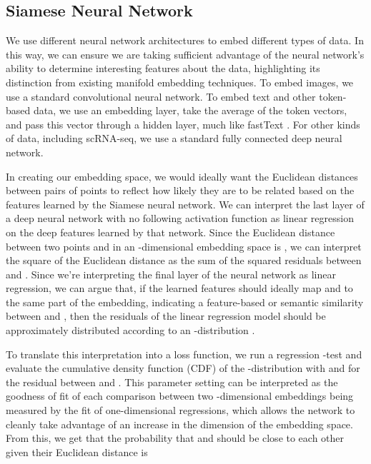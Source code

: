 \documentclass{article}
\begin{document}
\subsection{Siamese Neural Network}



We use different neural network architectures to embed different types of data. In this way, we can ensure we are taking sufficient advantage of the neural network's ability to determine interesting features about the data, highlighting its distinction from existing manifold embedding techniques. To embed images, we use a standard convolutional neural network. To embed text and other token-based data, we use an embedding layer, take the average of the token vectors, and pass this vector through a hidden layer, much like fastText \cite{joulin2016bag}. For other kinds of data, including scRNA-seq, we use a standard fully connected deep neural network.

In creating our embedding space, we would ideally want the Euclidean distances between pairs of points to reflect how likely they are to be related based on the features learned by the Siamese neural network. We can interpret the last layer of a deep neural network with no following activation function as linear regression on the deep features learned by that network. Since the Euclidean distance between two points  and  in an -dimensional embedding space is , we can interpret the square of the Euclidean distance as the sum of the squared residuals between  and . Since we're interpreting the final layer of the neural network as linear regression, we can argue that, if the learned features should ideally map  and  to the same part of the embedding, indicating a feature-based or semantic similarity between  and , then the residuals of the linear regression model should be approximately distributed according to an -distribution \cite{ramsey1969tests}. 

To translate this interpretation into a loss function, we run a regression -test and evaluate the cumulative density function (CDF) of the -distribution with  and  for the residual between  and . This parameter setting can be interpreted as the goodness of fit of each comparison between two -dimensional embeddings being measured by the fit of  one-dimensional regressions, which allows the network to cleanly take advantage of an increase in the dimension of the embedding space. From this, we get that the probability that  and  should be close to each other given their Euclidean distance  is 
    
\end{document}
